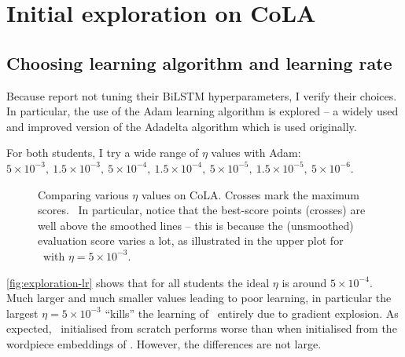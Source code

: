 \section{Initial exploration on CoLA}{
  \label{sec:A-hparam-exploration-cola}
  \subsection{Choosing learning algorithm and learning rate}{
    Because \citet{Tang_2019b} report not tuning their BiLSTM hyperparameters, I verify their choices.
    In particular, the use of the Adam learning algorithm is explored -- a widely used and improved version of the Adadelta algorithm which is used originally.

    For both students, I try a wide range of $\eta$ values with Adam: $5\times10^{-3},\ 1.5\times10^{-3},\ 5\times10^{-4},\ 1.5\times10^{-4},\ 5\times10^{-5},\ 1.5\times10^{-5},\ 5\times10^{-6}$.
    
    \begin{figure}[h!t]
      \centering
      \caption{Comparing various $\eta$ values on CoLA. Crosses mark the maximum scores. \sliding~In particular, notice that the best-score points (crosses) are well above the smoothed lines -- this is because the (unsmoothed) evaluation score varies a lot, as illustrated in the upper plot for \LSTMS~with $\eta=5\times10^{-3}.$}
      \label{fig:exploration-lr}
    \end{figure}

    \autoref{fig:exploration-lr} shows that for all students the ideal $\eta$ is around $5\times10^{-4}$. Much larger and much smaller values leading to poor learning, in particular the largest $\eta=5\times10^{-3}$ ``kills'' the learning of \BERTS~entirely due to gradient explosion.
    As expected, \BERTS~initialised from scratch performs worse than when initialised from the wordpiece embeddings of \BERTT. However, the differences are not large.

}}
